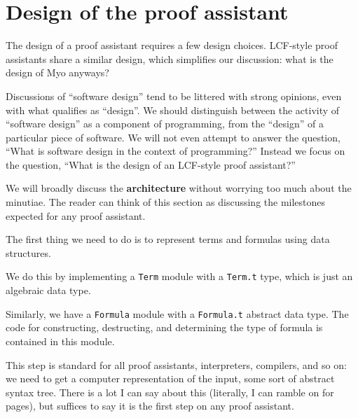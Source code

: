 
\section{Design of the proof assistant}

\begin{node}
The design of a proof assistant requires a few design
choices. LCF-style proof assistants share a similar design, which
simplifies our discussion: what is the design of Myo anyways?
\end{node}

\begin{aside}
Discussions of ``software design'' tend to be littered with strong
opinions, even with what qualifies as ``design''. We should
distinguish between the activity of ``software design'' as a component
of programming, from the ``design'' of a particular piece of
software. We will not even attempt to answer the question, ``What is
software design in the context of programming?'' Instead we focus on
the question, ``What is the design of an LCF-style proof assistant?''

We will broadly discuss the \textbf{architecture} without worrying too
much about the minutiae. The reader can think of this section as
discussing the milestones expected for any proof assistant.
\end{aside}

\begin{node}
The first thing we need to do is to represent terms and formulas using
data structures.

We do this by implementing a \texttt{Term} module with a
\texttt{Term.t} type, which is just an algebraic data type.

Similarly, we have a \texttt{Formula} module with a \texttt{Formula.t}
abstract data type. The code for constructing, destructing, and
determining the type of formula is contained in this module.

This step is standard for all proof assistants, interpreters,
compilers, and so on: we need to get a computer representation of the
input, some sort of abstract syntax tree. There is a lot I can say
about this (literally, I can ramble on for pages), but suffices to say
it is the first step on any proof assistant.
\end{node}

